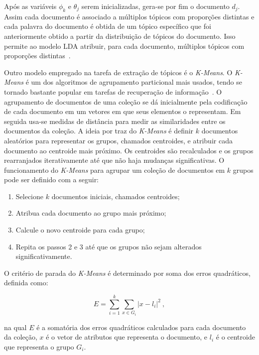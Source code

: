 Após as variáveis $\phi_k$ e $\theta_j$ serem inicializadas, gera-se por fim o documento $d_j$.
%
Assim cada documento é associado a múltiplos tópicos com proporções distintas e cada palavra do documento é obtida de um tópico específico que foi anteriormente obtido a partir da distribuição de tópicos do documento. Isso permite ao modelo LDA atribuir, para cada documento, múltiplos tópicos com proporções distintas~\cite{Blei2012, Faleiros2016}.









Outro modelo empregado na tarefa de extração de tópicos é o \textit{K-Means}. O \textit{K-Means} é um dos algoritmos de agrupamento particional mais usados, tendo se tornado bastante popular em tarefas de recuperação de informação~\cite{Manning2008}. O agrupamento de documentos de uma coleção se dá inicialmente pela codificação de cada documento em um vetores em que seus elementos o representam. Em seguida usa-se medidas de distância para medir as similaridades entre os documentos da coleção.
A ideia por traz do \textit{K-Means} é definir $k$ documentos aleatórios para representar os grupos, chamados centroides, e atribuir cada documento ao centroide mais próximo. Os centroides são recalculados e os grupos rearranjados iterativamente até que não haja mudanças significativas.
O funcionamento do \textit{K-Means} para agrupar um coleção de documentos em $k$ grupos pode ser definido com a seguir:
\begin{enumerate}
	\item Selecione $k$ documentos iniciais, chamados centroides;
	\item Atribua cada documento ao grupo mais próximo;
	\item Calcule o novo centroide para cada grupo;
	\item Repita os passos 2 e 3 até que os grupos não sejam alterados significativamente.
\end{enumerate}

O critério de parada do \textit{K-Means} é determinado por soma dos erros quadráticos, definida como:

\begin{equation}
	E = \sum_{i=1}^k    \sum_{x \in G_i}     |x - l_i |^2~,
\end{equation}

\noindent
na qual $E$ é a somatória dos erros quadráticos calculados para cada documento da coleção, $x$ é o vetor de atributos que representa o documento, e $l_i$ é o centroide que representa o grupo $G_i$.

